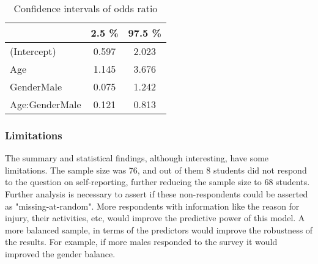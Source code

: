 \documentclass[11]{article}
\begin{document}
\begin{table}[H]
\centering
\begin{tabular}{lcc}
  \hline
 & 2.5 \% & 97.5 \% \\ 
  \hline
(Intercept) & 0.597 & 2.023 \\ 
  Age & 1.145 & 3.676 \\ 
  GenderMale & 0.075 & 1.242 \\ 
  Age:GenderMale & 0.121 & 0.813 \\ 
   \hline
\end{tabular}
\caption{Confidence intervals of odds ratio} 
\label{tab:Tab9CI}
\end{table}
\subsubsection*{Limitations}
The summary and statistical findings, although interesting, have some limitations. The sample size was 76, and out of them 8 students did not respond to the question on self-reporting, further reducing the sample size to 68 students. Further analysis is necessary to assert if these non-respondents could be asserted as "missing-at-random". More respondents with information like the reason for injury, their activities, etc, would improve the predictive power of this model. A more balanced sample, in terms of the predictors would improve the robustness of the results. For example, if more males responded to the survey it would improved the gender balance. 
\end{document}
